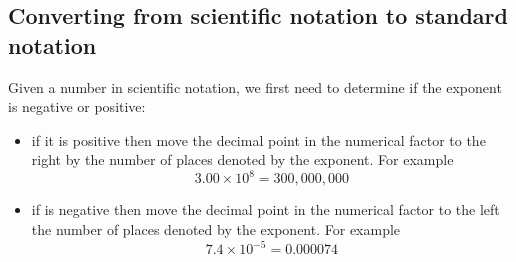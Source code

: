 \subsection{Converting from scientific notation to standard notation}
Given a number in scientific notation, we first need to determine if the
exponent is negative or positive:
\begin{itemize}
	\item if it is positive then move the decimal point in the numerical factor to the right by the number of 
	places denoted by the exponent. For example
	\[
		3.00\times 10^8 = 300,000,000
	\]
	\item if is negative then move the decimal point in the numerical factor to the 
	left the number of places denoted by the exponent. For example
	\[
		7.4\times 10^{-5} = 0.000074
	\]
\end{itemize} 

